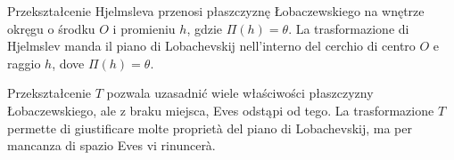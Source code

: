 \begin{proposition}
	Przekształcenie Hjelmsleva przenosi płaszczyznę Łobaczewskiego na wnętrze okręgu o środku $O$ i promieniu $h$, gdzie $\Pi(h) = \theta$. %
	La trasformazione di Hjelmslev manda il piano di Lobachevskij nell'interno del cerchio di centro $O$ e raggio $h$, dove $\Pi(h) = \theta$. %
\end{proposition}

Przekształcenie $T$ pozwala uzasadnić wiele właściwości płaszczyzny Łobaczewskiego, ale z braku miejsca, Eves odstąpi od tego. %
La trasformazione $T$ permette di giustificare molte proprietà del piano di Lobachevskij, ma per mancanza di spazio Eves vi rinuncerà. %

%